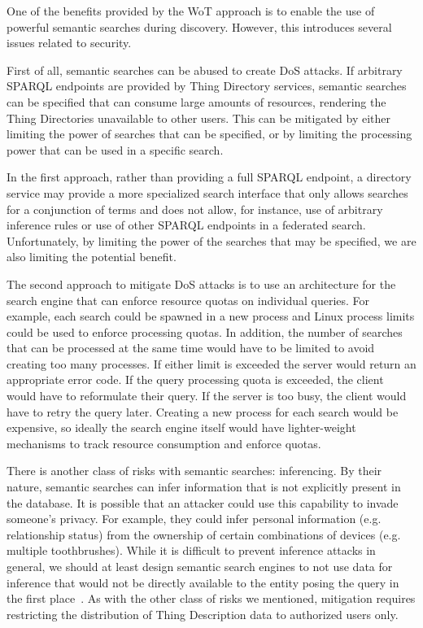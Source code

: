 One of the benefits provided by the WoT approach is to
enable the use of powerful semantic searches during discovery.
However, this introduces several issues related to security.

First of all, semantic searches can be abused to create DoS attacks.
If arbitrary SPARQL endpoints are provided by Thing Directory
services, semantic searches can be specified
that can consume large amounts of resources,
rendering the Thing Directories unavailable to other users.
This can be mitigated by either limiting the power of searches
that can be specified, or by limiting the processing
power that can be used in a specific search.

In the first approach, rather than providing a full
SPARQL endpoint, a directory service may provide a more specialized
search interface that only allows searches for a conjunction of terms
and does not allow, for instance, use of arbitrary inference rules
or use of other SPARQL endpoints in a federated search.
Unfortunately, by limiting the power
of the searches that may be specified, we are also limiting the
potential benefit.

The second approach to mitigate DoS attacks 
is to use an architecture for the 
search engine that can enforce resource quotas on individual queries.
For example, each search could be spawned in a new process and Linux
process limits could be used to enforce processing quotas. In addition,
the number of searches that can be processed at the same time would
have to be limited to avoid creating too many processes.
If either limit is exceeded the server would return an appropriate
error code.  If the query processing quota is exceeded, the client
would have to reformulate their query.  If the server is too busy,
the client would have to retry the query later.
Creating a new process for each search would be expensive,
so ideally the search engine itself would have lighter-weight
mechanisms to track resource consumption and enforce quotas.

There is another class of risks with semantic searches: 
inferencing. 
By their nature, semantic searches can infer information that is
not explicitly present in the database.
It is possible that an attacker could use this capability
to invade someone's privacy.  For example, they could infer
personal information (e.g. relationship status) from the ownership
of certain combinations of devices (e.g. multiple toothbrushes).
While it is difficult to prevent inference attacks in general,
we should at least design semantic search engines to not use 
data for inference that would not be directly available to the
entity posing the query in the first place~\cite{Thura2005a,Xia2014a}.  
As with the other class of risks we mentioned,
mitigation requires restricting the distribution of Thing Description
data to authorized users only.
